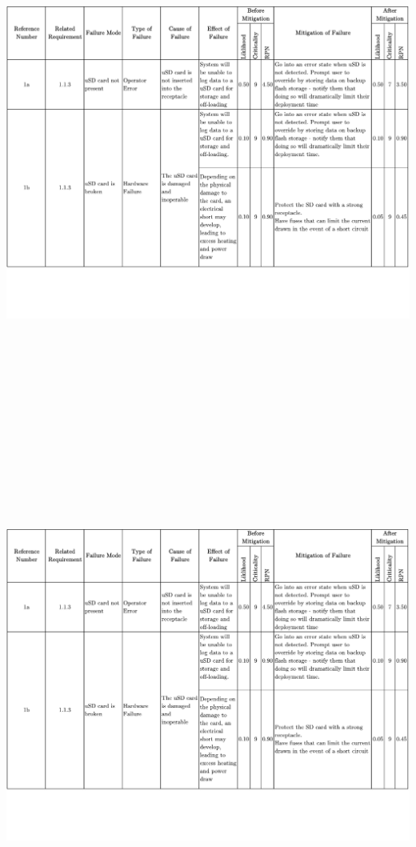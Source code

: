 \begin{landscape}
		\includegraphics[height=6.75in, page=2]{../include/ThetisFMECA.pdf}
		\newpage
		\includegraphics[height=6.75in, page=3]{../include/ThetisFMECA.pdf}

\end{landscape}
